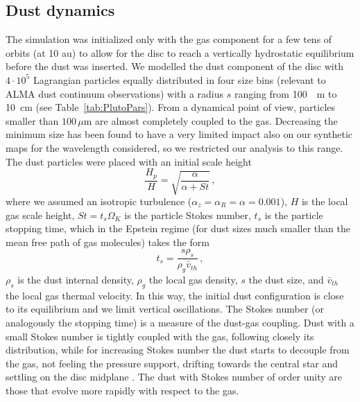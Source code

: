 \documentclass[fleqn,usenatbib]{mnras}
\begin{document}
    \subsection{Dust dynamics}\label{sec:dust}
    
        The simulation was initialized only with the gas component for a few tens of orbits (at 10 au) to allow for the disc to reach a vertically hydrostatic equilibrium before the dust was inserted.
        We modelled the dust component of the disc with $4\cdot10^5$ Lagrangian particles equally distributed in four size bins (relevant to ALMA dust continuum observations) with a radius $s$ ranging from \SI{100}{\mu m} to \SI{10}{cm} (see Table~\ref{tab:PlutoPars}).
        From a dynamical point of view, particles smaller than $100 \, \mu$m are almost completely coupled to the gas. Decreasing the minimum size has been found to have a very limited impact also on our synthetic maps for the wavelength considered, so we restricted our analysis to this range.
        The dust particles were placed with an initial scale height \citep{Youdin2007}
        \begin{equation}\label{eq:scale-height}
            \frac{H_p}{H} = \sqrt{\frac{\alpha}{\alpha + St}}\,,
        \end{equation}
        where we assumed an isotropic turbulence ($\alpha_z = \alpha_R = \alpha = 0.001$), $H$ is the local gas scale height, $St = t_s\Omega_K$ is the particle Stokes number, $t_s$ is the particle stopping time, which in the Epstein regime (for dust sizes much smaller than the mean free path of gas molecules) takes the form
        \begin{equation}\label{eq:Stokes_number}
            t_s = \frac{s\rho_s}{\rho_g\bar{v}_{th}}\,,
        \end{equation}
        $\rho_s$ is the dust internal density, $\rho_g$ the local gas density, $s$ the dust size, and $\bar{v}_{th}$ the local gas thermal velocity. In this way, the initial dust configuration is close to its equilibrium and we limit vertical oscillations.
        The Stokes number (or analogously the stopping time) is a measure of the dust-gas coupling. Dust with a small Stokes number is tightly coupled with the gas, following closely its distribution, while for increasing Stokes number the dust starts to decouple from the gas, not feeling the pressure support, drifting towards the central star and settling on the disc midplane \citep{Whipple1972,Weidenschilling1977}. The dust with Stokes number of order unity are those that evolve more rapidly with respect to the gas.
\end{document}
